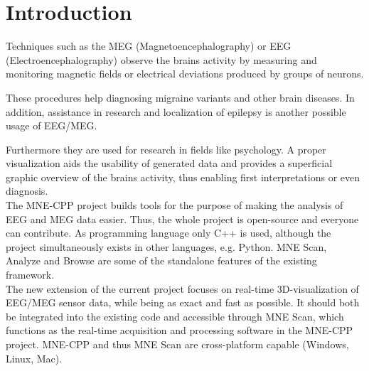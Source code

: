 
\section{Introduction}


	
	Techniques such as the MEG (Magnetoencephalography) or EEG (Electroencephalography) observe the brains activity by 				measuring and monitoring magnetic fields or electrical deviations produced by groups of neurons.

	These procedures help diagnosing migraine variants and other brain diseases. In addition, assistance in 				research and localization of epilepsy is another possible usage of EEG/MEG. 
	 
	Furthermore they are used for research in fields like psychology.
	A proper visualization aids the usability of generated data and provides a superficial graphic overview of the brains 			activity, thus enabling first interpretations or even diagnosis.\\
	

	The MNE-CPP  project builds tools for the purpose of making the analysis of EEG and MEG data easier.
	Thus, the whole project is open-source and everyone can contribute. As programming language only C++ is used, although the 	project simultaneously exists in other languages, e.g. Python. 
	MNE Scan, Analyze and Browse are some of the standalone features of the existing framework. \\

	The new extension of the current project focuses on real-time 3D-visualization of EEG/MEG sensor data, while being as 			exact and fast as possible. It should both be integrated into the existing code and accessible through MNE Scan, which 			functions as the real-time acquisition and processing software in the MNE-CPP project. MNE-CPP and thus MNE Scan are 			cross-platform capable (Windows, Linux, Mac). 
  
